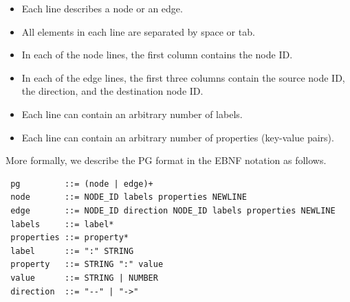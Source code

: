 \documentclass[runningheads]{llncs}
\begin{document}
\begin{itemize}
    \item Each line describes a node or an edge.
    \item All elements in each line are separated by space or tab.
    \item In each of the node lines, the first column contains the node ID.
    \item In each of the edge lines, the first three columns contain the source node ID, the direction, and the destination node ID.
    \item Each line can contain an arbitrary number of labels.
    \item Each line can contain an arbitrary number of properties (key-value pairs).
\end{itemize}

More formally, we describe the PG format in the EBNF notation as follows.

\begin{defi}
\leavevmode
\begin{verbatim}
 pg         ::= (node | edge)+
 node       ::= NODE_ID labels properties NEWLINE
 edge       ::= NODE_ID direction NODE_ID labels properties NEWLINE
 labels     ::= label*
 properties ::= property*
 label      ::= ":" STRING
 property   ::= STRING ":" value
 value      ::= STRING | NUMBER
 direction  ::= "--" | "->"
\end{verbatim}
\end{defi}


\end{document}

